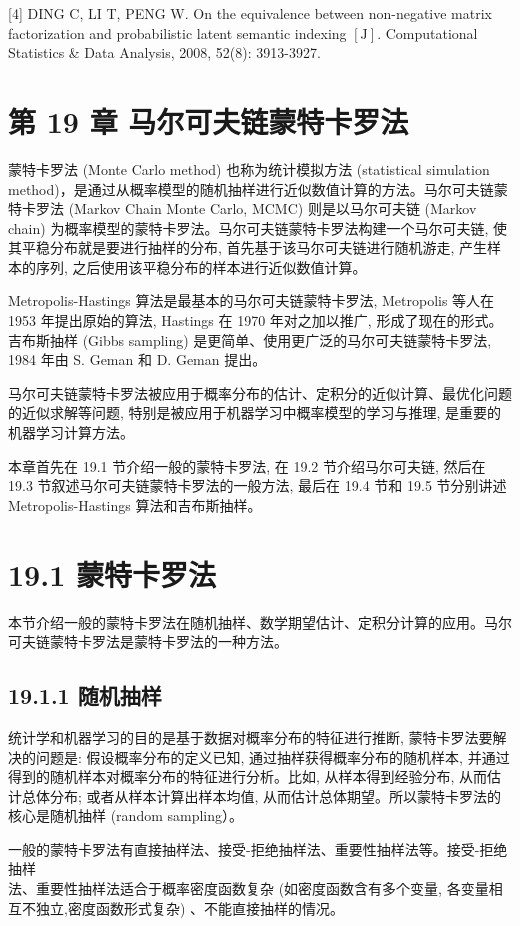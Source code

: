 \documentclass[10pt]{article}
\begin{document}
[4] DING C, LI T, PENG W. On the equivalence between non-negative matrix factorization and probabilistic latent semantic indexing $[\mathrm{J}]$. Computational Statistics \& Data Analysis, 2008, 52(8): 3913-3927.

\section*{第 19 章 马尔可夫链蒙特卡罗法}
蒙特卡罗法 (Monte Carlo method) 也称为统计模拟方法 (statistical simulation method)，是通过从概率模型的随机抽样进行近似数值计算的方法。马尔可夫链蒙特卡罗法 (Markov Chain Monte Carlo, MCMC) 则是以马尔可夫链 (Markov chain) 为概率模型的蒙特卡罗法。马尔可夫链蒙特卡罗法构建一个马尔可夫链, 使其平稳分布就是要进行抽样的分布, 首先基于该马尔可夫链进行随机游走, 产生样本的序列, 之后使用该平稳分布的样本进行近似数值计算。

Metropolis-Hastings 算法是最基本的马尔可夫链蒙特卡罗法, Metropolis 等人在 1953 年提出原始的算法, Hastings 在 1970 年对之加以推广, 形成了现在的形式。吉布斯抽样 (Gibbs sampling) 是更简单、使用更广泛的马尔可夫链蒙特卡罗法, 1984 年由 S. Geman 和 D. Geman 提出。

马尔可夫链蒙特卡罗法被应用于概率分布的估计、定积分的近似计算、最优化问题的近似求解等问题, 特别是被应用于机器学习中概率模型的学习与推理, 是重要的机器学习计算方法。

本章首先在 19.1 节介绍一般的蒙特卡罗法, 在 19.2 节介绍马尔可夫链, 然后在 19.3 节叙述马尔可夫链蒙特卡罗法的一般方法, 最后在 19.4 节和 19.5 节分别讲述 Metropolis-Hastings 算法和吉布斯抽样。

\section*{19.1 蒙特卡罗法}
本节介绍一般的蒙特卡罗法在随机抽样、数学期望估计、定积分计算的应用。马尔可夫链蒙特卡罗法是蒙特卡罗法的一种方法。

\subsection*{19.1.1 随机抽样}
统计学和机器学习的目的是基于数据对概率分布的特征进行推断, 蒙特卡罗法要解决的问题是: 假设概率分布的定义已知, 通过抽样获得概率分布的随机样本, 并通过得到的随机样本对概率分布的特征进行分析。比如, 从样本得到经验分布, 从而估计总体分布; 或者从样本计算出样本均值, 从而估计总体期望。所以蒙特卡罗法的核心是随机抽样 (random sampling）。

一般的蒙特卡罗法有直接抽样法、接受-拒绝抽样法、重要性抽样法等。接受-拒绝抽样\\
法、重要性抽样法适合于概率密度函数复杂 (如密度函数含有多个变量, 各变量相互不独立,密度函数形式复杂) 、不能直接抽样的情况。
\end{document}
